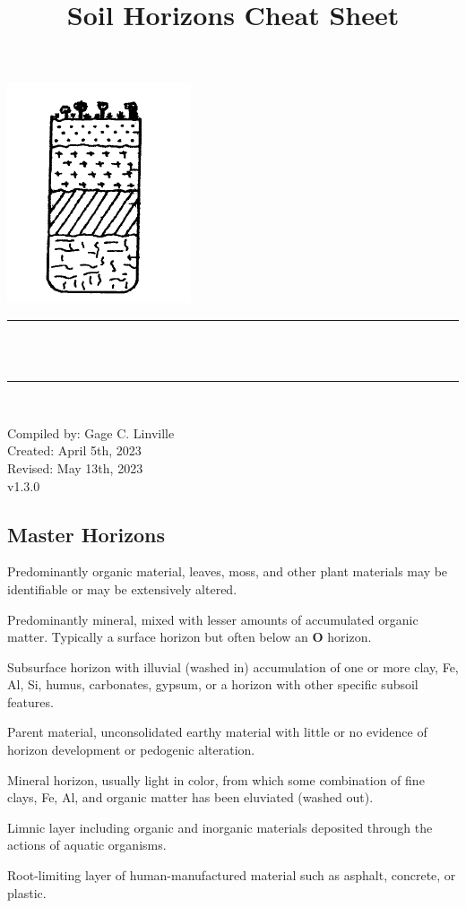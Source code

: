 \documentclass[12pt]{exam}
\title{Soil Horizons Cheat Sheet}					%
\author{\studentone}				                %
\makeatletter
\newcommand{\semanticversion}{v1.3.0}               %
\newcommand{\studentone}{Gage C. Linville}			%
\newcommand{\creationdate}{April 5th, 2023}
\newcommand{\revisiondate}{May 13th, 2023}
\def\maketitle{%
  \null
  \thispagestyle{empty}
  \begin{center}\leavevmode
       \normalfont
       \includegraphics[width=0.20\columnwidth]{figures/Image_Edit.png}
	\rule{\linewidth}{0.2 mm} \\[0.4 cm]
	{ \huge \bfseries \@title}\\
	\rule{\linewidth}{0.2 mm} \\[0.4 cm]

	\begin{minipage}{0.5\textwidth}
		 \begin{center}\large
			Compiled by: \studentone\\
            Created: \creationdate\\
            Revised: \revisiondate\\
            \semanticversion\\
           \studentwebsite
			\end{center}
			\end{minipage}
   \end{center}
   \vfill
   \null
   \cleardoublepage
  }
\makeatother
\begin{document}
\maketitle
\let\cleardoublepage\clearpage
\sloppy


\begin{center}
   \section*{Master Horizons}
\end{center}
 \hrulefill

\begin{description}[labelsep=2.45em, align=right]
\item[O]
Predominantly organic material, leaves, moss, and other plant materials may be identifiable or may be extensively altered.
\vspace{0.1in}
\item[A]
Predominantly mineral, mixed with lesser amounts of accumulated organic matter. Typically a surface horizon but often below an \textbf{O} horizon.
\vspace{0.1in}
\item[B]
Subsurface horizon with illuvial (washed in) accumulation of one or more clay, Fe, Al, Si, humus, carbonates, gypsum, or a horizon with other specific subsoil features.
\vspace{0.1in}
\item[C]
Parent material, unconsolidated earthy material with little or no evidence of horizon development or pedogenic alteration.
\vspace{0.1in}
\item[E]
Mineral horizon, usually light in color, from which some combination of fine clays, Fe, Al, and organic matter has been eluviated (washed out).
\vspace{0.1in}
\item[L]
Limnic layer including organic and inorganic materials deposited through the actions of aquatic organisms.
\vspace{0.1in}
\item[M]
Root-limiting layer of human-manufactured material such as asphalt, concrete, or plastic.
\vspace{0.1in}
\item[R]

\end{description}
\end{document}
